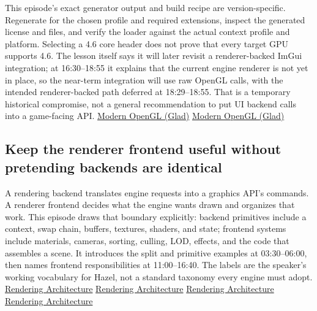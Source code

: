 This episode's exact generator output and build recipe are version-specific. Regenerate for the chosen profile and required extensions, inspect the generated license and files, and verify the loader against the actual context profile and platform. Selecting a 4.6 core header does not prove that every target GPU supports 4.6. The lesson itself says it will later revisit a renderer-backed ImGui integration; at 16:30--18:55 it explains that the current engine renderer is not yet in place, so the near-term integration will use raw OpenGL calls, with the intended renderer-backed path deferred at 18:29--18:55. That is a temporary historical compromise, not a general recommendation to put UI backend calls into a game-facing API. \href{https://www.youtube.com/watch?v=HFyHIc89z1g&t=990s}{Modern OpenGL (Glad)} \href{https://www.youtube.com/watch?v=HFyHIc89z1g&t=1109s}{Modern OpenGL (Glad)}

\subsection{Keep the renderer frontend useful without pretending backends are identical}\label{06-engine-ii-ch025-keep-the-renderer-frontend-useful-without-pretending-backends-are-identical}

A rendering backend translates engine requests into a graphics API's commands. A renderer frontend decides what the engine wants drawn and organizes that work. This episode draws that boundary explicitly: backend primitives include a context, swap chain, buffers, textures, shaders, and state; frontend systems include materials, cameras, sorting, culling, LOD, effects, and the code that assembles a scene. It introduces the split and primitive examples at 03:30--06:00, then names frontend responsibilities at 11:00--16:40. The labels are the speaker's working vocabulary for Hazel, not a standard taxonomy every engine must adopt. \href{https://www.youtube.com/watch?v=YPWNNmlIUIo&t=210s}{Rendering Architecture} \href{https://www.youtube.com/watch?v=YPWNNmlIUIo&t=330s}{Rendering Architecture} \href{https://www.youtube.com/watch?v=YPWNNmlIUIo&t=660s}{Rendering Architecture} \href{https://www.youtube.com/watch?v=YPWNNmlIUIo&t=890s}{Rendering Architecture}

